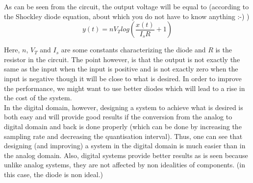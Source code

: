 As can be seen from the circuit, the output voltage will be equal to (according to the Shockley diode equation, about which you do not have to know anything :-) )
\[
    y(t) = nV_{T}log(\frac{x(t)}{I_{s}R} + 1)
\]

Here, $n$, $V_{T}$ and $I_{s}$ are some constants characterizing the diode and $R$ is the resistor in the circuit. The point however, is that  the output is not exactly the same as the input when the input is positive and is not exactly zero when the input is negative though it will be close to what is desired. In order to improve the performance, we might want to use better diodes which will lead to a rise in the cost of the system.\\
\indent In the digital domain, however, designing a system to achieve what is desired is both easy and will provide good results if the conversion from the analog to digital domain and back is done properly (which can be done by increasing the sampling rate and decreasing the quantisation interval). Thus, one can see that designing (and improving) a system in the digital domain is much easier than in the analog domain. Also, digital systems provide better results as is seen because unlike analog systems, they are not affected by non idealities of components. (in this case, the diode is non ideal.)




